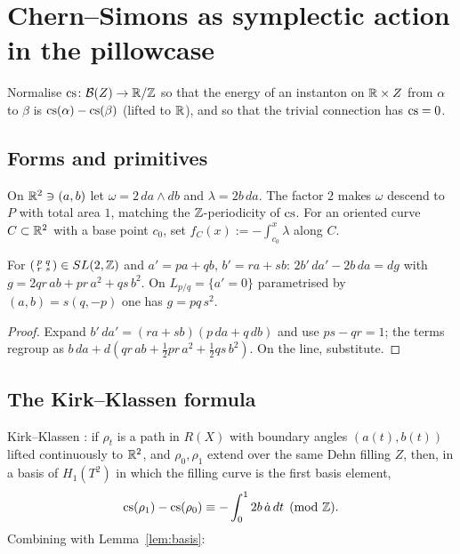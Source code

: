 \section{Chern--Simons as symplectic action in the pillowcase}\label{sec:action}
Normalise $\mathrm{cs}\colon\mathcal B(Z)\to\mathbb{R}/\mathbb{Z}$ so that the energy of an instanton on $\mathbb{R}\times Z$ from $\alpha$ to
$\beta$ is $\mathrm{cs}(\alpha)-\mathrm{cs}(\beta)$ (lifted to $\mathbb{R}$), and so that the trivial connection has $\mathrm{cs}=0$.

\subsection{Forms and primitives}
On $\mathbb{R}^2\ni(a,b)$ let $\omega=2\,da\wedge db$ and $\lambda=2b\,da$.  The factor $2$ makes $\omega$ descend to $P$ with
total area $1$, matching the $\mathbb{Z}$-periodicity of $\mathrm{cs}$.  For an oriented curve $C\subset\mathbb{R}^2$ with a base point
$c_0$, set $f_C(x):=-\int_{c_0}^{x}\lambda$ along $C$.

\begin{lemma}\label{lem:basis}
For $\begin{psmallmatrix}p&q\\r&s\end{psmallmatrix}\in SL(2,\mathbb{Z})$ and $a'=pa+qb$, $b'=ra+sb$:
$2b'\,da'-2b\,da=dg$ with $g=2qr\,ab+pr\,a^2+qs\,b^2$.  On $L_{p/q}=\{a'=0\}$ parametrised by $(a,b)=s(q,-p)$ one
has $g=pq\,s^2$.
\end{lemma}
\begin{proof}
Expand $b'\,da'=(ra+sb)(p\,da+q\,db)$ and use $ps-qr=1$; the terms regroup as $b\,da+d(qr\,ab+\tfrac12pr\,a^2+\tfrac12qs\,b^2)$.
On the line, substitute.
\end{proof}

\subsection{The Kirk--Klassen formula}
Kirk--Klassen \cite{KK90}: if $\rho_t$ is a path in $R(X)$ with boundary angles $(a(t),b(t))$ lifted continuously to
$\mathbb{R}^2$, and $\rho_0,\rho_1$ extend over the same Dehn filling $Z$, then, in a basis of $H_1(T^2)$ in which the filling
curve is the first basis element,
\[
\mathrm{cs}(\rho_1)-\mathrm{cs}(\rho_0)\equiv-\int_0^1 2b\,\dot a\,dt\pmod{\mathbb{Z}}.
\]
Combining with Lemma~\ref{lem:basis}:

